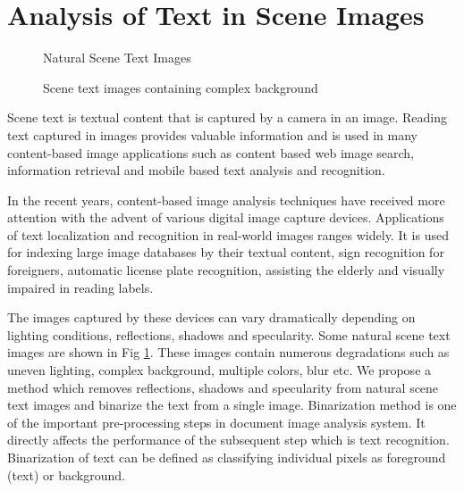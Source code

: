 \section{Analysis of Text in Scene Images}
\begin{figure}[t]
\centering
{}
\caption
{Natural Scene Text Images}
\label{fig:scenetext}
\end{figure}
\begin{figure}[t]
\centering
{}
\caption
{Scene text images containing complex background}
\label{fig:textchallenge}
\end{figure}

Scene text is textual content that is captured by a camera in an image.
Reading text captured in images provides valuable information and is
used in many content-based image
applications such as content based web image search,
information retrieval and mobile based text analysis
and recognition.

In the recent years, content-based image analysis techniques have received more attention with the 
advent of various digital image capture devices.
Applications of text localization
and recognition in real-world images ranges widely. It is used for indexing large image
databases by their textual content, sign recognition
for foreigners, automatic license plate recognition, assisting the elderly and visually
impaired in reading labels.

The images captured by these devices can vary dramatically depending on lighting conditions, reflections, 
shadows and specularity. Some natural scene text images are shown in Fig \ref{fig:scenetext}.
These images contain numerous degradations such as uneven lighting, complex background, multiple colors, blur etc.
We propose a method which removes reflections, shadows and specularity from natural scene text images and 
binarize the text from a single image.
Binarization method is one of the important pre-processing steps in document image analysis system. 
It directly affects the performance of the subsequent step which is text recognition.
Binarization of text can be defined as classifying individual pixels as foreground (text) or background. 

